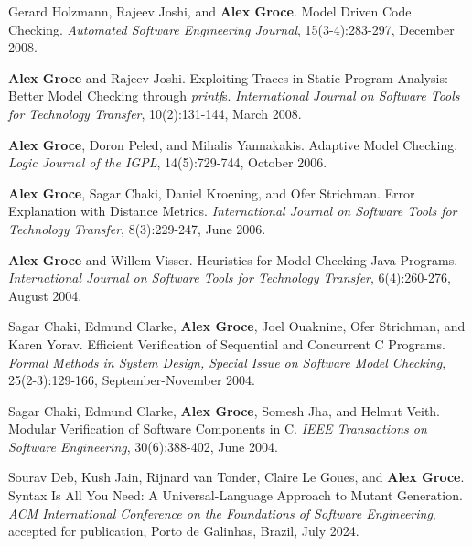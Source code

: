 \documentclass[ComputerScience]{vita}
\begin{document}
\begin{vita}
\begin{Refereed Journal Publications}
\item Gerard Holzmann, Rajeev Joshi, and {\bf Alex Groce}.
\newblock Model Driven Code Checking.
\newblock \emph{Automated Software Engineering Journal}, 15(3-4):283-297, December 2008.

\item
{\bf Alex Groce} and Rajeev Joshi.
\newblock Exploiting Traces in Static Program Analysis: Better Model Checking through \emph{printf}s.
\newblock \emph{International Journal on Software Tools for Technology Transfer}, 10(2):131-144, March 2008.

\item
{\bf Alex Groce}, Doron Peled, and Mihalis Yannakakis.
\newblock Adaptive Model Checking.
\newblock \emph{Logic Journal of the IGPL}, 14(5):729-744, October 2006.

\item
{\bf Alex Groce}, Sagar Chaki, Daniel Kroening, and Ofer Strichman.
\newblock Error Explanation with Distance Metrics.
\newblock \emph{International Journal on Software Tools for Technology Transfer}, 8(3):229-247, June 2006.

\item
{\bf Alex Groce} and Willem Visser.
\newblock Heuristics for Model Checking Java Programs.
\newblock \emph{International Journal on Software Tools for Technology Transfer}, 6(4):260-276, August 2004.


\item
Sagar Chaki, Edmund Clarke, {\bf Alex Groce}, Joel Ouaknine, Ofer Strichman, and Karen Yorav.
\newblock Efficient Verification of Sequential and Concurrent C Programs.
\newblock \emph{Formal Methods in System Design, Special Issue on Software Model Checking}, 25(2-3):129-166, September-November 2004.

\item
Sagar Chaki, Edmund Clarke, {\bf Alex Groce}, Somesh Jha, and Helmut Veith.
\newblock Modular Verification of Software Components in C.
\newblock \emph{IEEE Transactions on Software Engineering}, 30(6):388-402, June 2004.

\end{Refereed Journal Publications}

\begin{Refereed Conference and Workshop Publications}

\item Sourav Deb, Kush Jain, Rijnard van Tonder, Claire Le Goues, and
  {\bf Alex Groce}.
 \newblock  Syntax Is All You Need: A Universal-Language Approach to
 Mutant Generation.
  \newblock \emph{ACM International Conference
on the Foundations of Software Engineering},
accepted for publication, Porto de Galinhas, Brazil, July 2024.


\end{Refereed Conference and Workshop Publications}
\end{vita}
\end{document}
